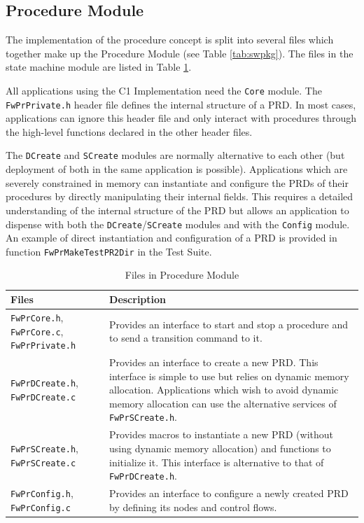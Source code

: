 \documentclass[manual]{../fwprofile}
\begin{document}
\subsection{Procedure Module}
The implementation of the procedure concept is split into several files which together make up the  
Procedure Module (see Table \ref{tab:swpkg}). The files in the state machine module are listed 
in Table \ref{tab:prModule}.

All applications using the C1 Implementation need the \texttt{Core} module. The \texttt{FwPrPrivate.h} header 
file defines the internal structure of a PRD. In most cases, applications can ignore this header file 
and only interact with procedures through the high-level functions declared in the other header files.

The \texttt{DCreate} and \texttt{SCreate} modules are normally alternative to each other (but deployment of 
both in the same application is possible). Applications which are severely constrained in memory can instantiate 
and configure the PRDs of their procedures by directly manipulating their internal fields. This requires a 
detailed understanding of the internal structure of the PRD but allows an application to dispense with both 
the \texttt{DCreate}/\texttt{SCreate} modules and with the \texttt{Config} module. An example of direct instantiation 
and configuration of a PRD is provided in function \texttt{FwPrMakeTestPR2Dir} in the Test Suite. 

\begin{longtable}{|p{2.5cm}|p{8.7cm}|}
\caption{Files in Procedure Module} \label{tab:prModule} \\
\hline
\rowcolor{gray}
\textbf{Files} & \textbf{Description} \\
\hline\hline
\texttt{FwPrCore.h}, \texttt{FwPrCore.c}, \texttt{FwPrPrivate.h} & Provides an interface to start and stop a procedure and 
to send a transition command to it.\\
\hline
\texttt{FwPrDCreate.h}, \texttt{FwPrDCreate.c} & Provides an interface to create a new PRD. This interface is simple to use 
but relies on dynamic memory allocation. Applications which wish to avoid dynamic memory allocation can use the alternative services of \texttt{FwPrSCreate.h}. \\ 
\hline
\texttt{FwPrSCreate.h}, \texttt{FwPrSCreate.c} & Provides macros to instantiate a new PRD (without using dynamic memory allocation) 
and functions to initialize it. This interface is alternative to that of \texttt{FwPrDCreate.h}. \\ 
\hline
\texttt{FwPrConfig.h}, \texttt{FwPrConfig.c}  & Provides an interface to configure a newly created PRD by defining its nodes and control flows. \\
\hline
\end{longtable}
\end{document}
